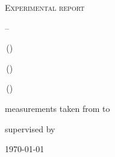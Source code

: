 
\makeatletter
\newcommand*{\protokollemailparse}[1]{%
	\@for\@tempa:=#1\do{%
		\normalsize\email{\@tempa}\\
	}%
}
\makeatother

\begin{titlepage}
	\centering
	{\scshape\LARGE Experimental report \par}
	\vspace{1cm}
	{\scshape\huge \varNum {} -- \varName\par}
	\vspace{2.5cm}
	{\LARGE \varGruppe\par}
	\vspace{0.5cm}
	{\large \varNameA \,(\varEmailA) \par}
	{\large \varNameB \,(\varEmailB) \par}
	{\large \varNameC \,(\varEmailC) \par}
	\vfill
	measurements taken from {\large \varDatumA} to {\large \varDatumB}\par
	{supervised by \large \varBetreuer} 
	\vfill	
	{\large \today\par}
\end{titlepage}


\maketitle

